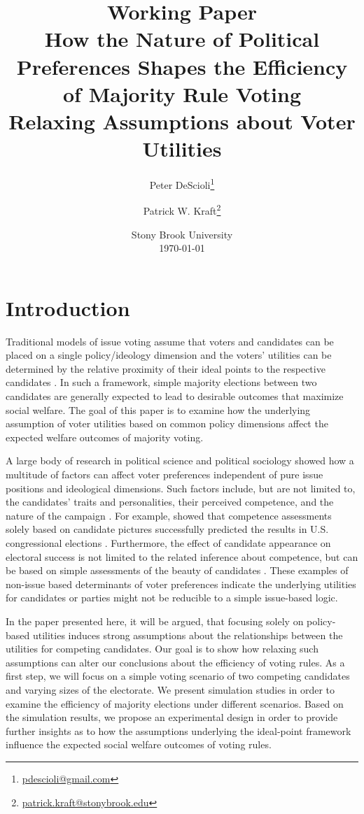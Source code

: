\documentclass[12pt]{article}
\author{Peter DeScioli\thanks{\href{mailto:pdescioli@gmail.com}{pdescioli@gmail.com}} \and
		Patrick W. Kraft\thanks{\href{mailto:patrick.kraft@stonybrook.edu}{patrick.kraft@stonybrook.edu}} }
\title{{\small Working Paper}\\
How the Nature of Political Preferences Shapes the Efficiency of Majority Rule Voting \\
{\large Relaxing Assumptions about Voter Utilities}}
\date{Stony Brook University \vspace{1cm}\\ \today}
\begin{document}
\maketitle
\doublespacing



\section{Introduction}

Traditional models of issue voting assume that voters and candidates can be placed on a single policy/ideology dimension and the voters' utilities can be determined by the relative proximity of their ideal points to the respective candidates \citep[c.f.][]{downs1957economic}. In such a framework, simple majority elections between two candidates are generally expected to lead to desirable outcomes that maximize social welfare. The goal of this paper is to examine how the underlying assumption of voter utilities based on common policy dimensions affect the expected welfare outcomes of majority voting.

A large body of research in political science and political sociology showed how a multitude of factors can affect voter preferences independent of pure issue positions and ideological dimensions. Such factors include, but are not limited to, the candidates' traits and personalities, their perceived competence, and the nature of the campaign \citep[see for example][]{hayes2005candidate}. For example, \cite{todorov2005inferences} showed that competence assessments solely based on candidate pictures successfully predicted the results in U.S. congressional elections \citep[see also][]{mattes2010predicting}. Furthermore, the effect of candidate appearance on electoral success is not limited to the related inference about competence, but can be based on simple assessments of the beauty of candidates \citep{berggren2010looks}. These examples of non-issue based determinants of voter preferences indicate the underlying utilities for candidates or parties might not be reducible to a simple issue-based logic.

In the paper presented here, it will be argued, that focusing solely on policy-based utilities induces strong assumptions about the relationships between the utilities for competing candidates. Our goal is to show how relaxing such assumptions can alter our conclusions about the efficiency of voting rules. As a first step, we will focus on a simple voting scenario of two competing candidates and varying sizes of the electorate. We present simulation studies in order to examine the efficiency of majority elections under different scenarios. Based on the simulation results, we propose an experimental design in order to provide further insights as to how the assumptions underlying the ideal-point framework influence the expected social welfare outcomes of voting rules.
\end{document}
